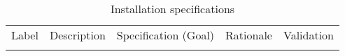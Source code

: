 \begin{footnotesize}
\begin{longtable}{p{}p{}p{}p{}p{}}
\caption{Installation specifications } \\
  \rowcolor{dunesky}
       Label & Description  & Specification \newline (Goal) & Rationale & Validation \\  \colhline










\label{tab:specs:SP-INST}
\end{longtable}
\end{footnotesize}